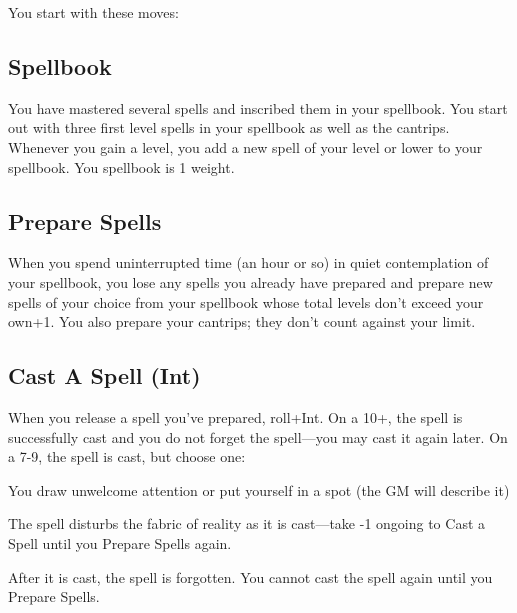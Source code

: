          

         

           
\startInstructions
You start with these moves:
\stopInstructions
           
\subsection{Spellbook}   
           

You have mastered several spells and inscribed them in your spellbook. You start out with three first level spells in your spellbook as well as the cantrips. Whenever you gain a level, you add a new spell of your level or lower to your spellbook. You spellbook is 1 weight.

           
\subsection{Prepare Spells}    
           

When you spend uninterrupted time (an hour or so) in quiet contemplation of your spellbook, you lose any spells you already have prepared and prepare new spells of your choice from your spellbook whose total levels don't exceed your own+1. You also prepare your cantrips; they don't count against your limit.

           
\subsection{Cast A Spell (Int)}     
           

When you release a spell you've prepared, roll+Int. On a 10+, the spell is successfully cast and you do not forget the spell—you may cast it again later. On a 7-9, the spell is cast, but choose one:

           
\startitemize[1,packed]
             
\item You draw unwelcome attention or put yourself in a spot (the GM will describe it)

             
\item The spell disturbs the fabric of reality as it is cast—take -1 ongoing to Cast a Spell until you Prepare Spells again.

             
\item After it is cast, the spell is forgotten. You cannot cast the spell again until you Prepare Spells.


